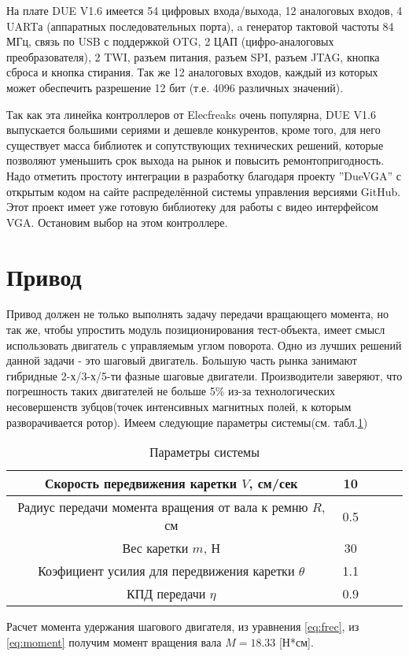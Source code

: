 На плате DUE V1.6 имеется 54 цифровых входа/выхода, 12 аналоговых входов, 4 UARTа (аппаратных последовательных порта), a генератор тактовой частоты 84 МГц, связь по USB с поддержкой OTG, 2 ЦАП (цифро-аналоговых преобразователя), 2 TWI, разъем питания,  разъем SPI, разъем JTAG, кнопка сброса и кнопка стирания. Так же 12 аналоговых входов, каждый из которых может обеспечить разрешение 12 бит (т.е. 4096 различных значений).

Так как эта линейка контроллеров от Elecfreaks очень популярна, DUE V1.6 выпускается большими сериями и дешевле конкурентов, кроме того, для него существует масса библиотек и сопутствующих технических решений, которые позволяют уменьшить срок выхода на рынок и повысить ремонтопригодность. Надо отметить простоту интеграции в разработку благодаря проекту ''DueVGA'' с открытым кодом на сайте распределённой системы управления версиями GitHub\cite{s_2}. Этот проект имеет уже готовую библиотеку для работы с видео интерфейсом VGA. Остановим выбор на этом контроллере.

\section{Привод}

Привод должен не только выполнять задачу передачи вращающего момента, но так же, чтобы упростить модуль позиционирования тест-объекта, имеет смысл использовать двигатель с управляемым углом поворота. Одно из лучших решений данной задачи - это шаговый двигатель. Большую часть рынка занимают гибридные 2-х/3-х/5-ти фазные шаговые двигатели. Производители заверяют, что погрешность таких двигателей не больше 5\% из-за технологических несовершенств зубцов(точек интенсивных магнитных полей, к которым разворачивается ротор).
Имеем следующие параметры системы(см. табл.\ref{tab:MechParamSys})

\begin{table}[ht]
\centering
\begin{tabular}{|c|c|c|c|c|}
\hline 
Скорость передвижения каретки $V$, см/сек & 10\\
\hline 
Радиус передачи момента вращения от вала к ремню $R$, см & 0.5\\
\hline 
Вес каретки $m$, Н & 30\\
\hline 
Коэфициент усилия для передвижения каретки $\theta$ & 1.1\\
\hline 
КПД передачи $\eta$ & 0.9 \\
\hline 

\end{tabular} 
\caption{Параметры системы}
\label{tab:MechParamSys}
\end{table}
Расчет момента удержания шагового двигателя, из уравнения \ref{eq:frec}, из \ref{eq:moment} получим момент вращения вала $M=18.33$ [Н*см].

